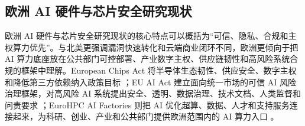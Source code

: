 \subsection{欧洲 AI 硬件与芯片安全研究现状}

欧洲 AI 硬件与芯片安全研究现状的核心特点可以概括为“可信、隐私、合规和主权算力优先”。与北美更强调漏洞快速转化和云端商业闭环不同，欧洲更倾向于把 AI 算力底座放在公共部门可控部署、产业数字主权、供应链韧性和高风险系统合规的框架中理解。European Chips Act 将半导体生态韧性、供应安全、数字主权和降低第三方依赖纳入政策目标 \cite{euchipsact2023}；EU AI Act 建立面向统一市场的可信 AI 风险治理框架，对高风险 AI 系统提出安全、透明、数据治理、技术文档、人类监督和问责要求 \cite{euaiact2024}；EuroHPC AI Factories 则把 AI 优化超算、数据、人才和支持服务连接起来，为科研、创业、产业和公共部门提供欧洲范围内的 AI 算力入口 \cite{eurohpcAIFactories2026,ecAIFactories2026}。

